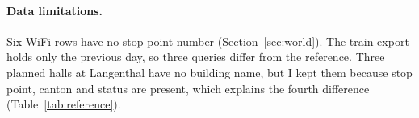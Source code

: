 \paragraph{Data limitations.}
Six WiFi rows have no stop-point number (Section~\ref{sec:world}). The train export holds only the previous day, so three queries differ from the reference. Three planned halls at Langenthal have no building name, but I kept them because stop point, canton and status are present, which explains the fourth difference (Table~\ref{tab:reference}).

